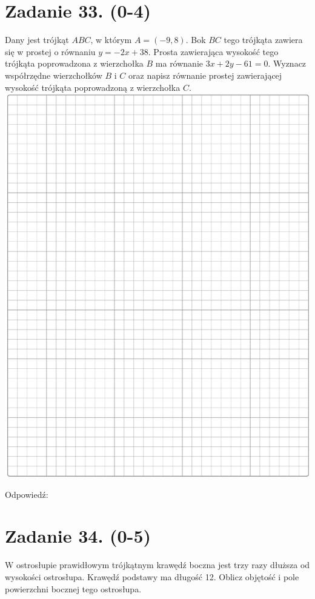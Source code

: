 \documentclass[10pt]{article}
\begin{document}
\section*{Zadanie 33. (0-4)}
Dany jest trójkąt \(A B C\), w którym \(A=(-9,8)\). Bok \(B C\) tego trójkąta zawiera się w prostej o równaniu \(y=-2 x+38\). Prosta zawierająca wysokość tego trójkąta poprowadzona z wierzchołka \(B\) ma równanie \(3 x+2 y-61=0\). Wyznacz współrzędne wierzchołków \(B\) i \(C\) oraz napisz równanie prostej zawierającej wysokość trójkąta poprowadzoną z wierzchołka \(C\).\\
\includegraphics[max width=\textwidth, center]{2024_11_21_724abc2cf5a71562f5b2g-14}

Odpowiedź:

\section*{Zadanie 34. (0-5)}
W ostrosłupie prawidłowym trójkątnym krawędź boczna jest trzy razy dłuższa od wysokości ostrosłupa. Krawędź podstawy ma długość 12. Oblicz objętość i pole powierzchni bocznej tego ostrosłupa.
\end{document}
